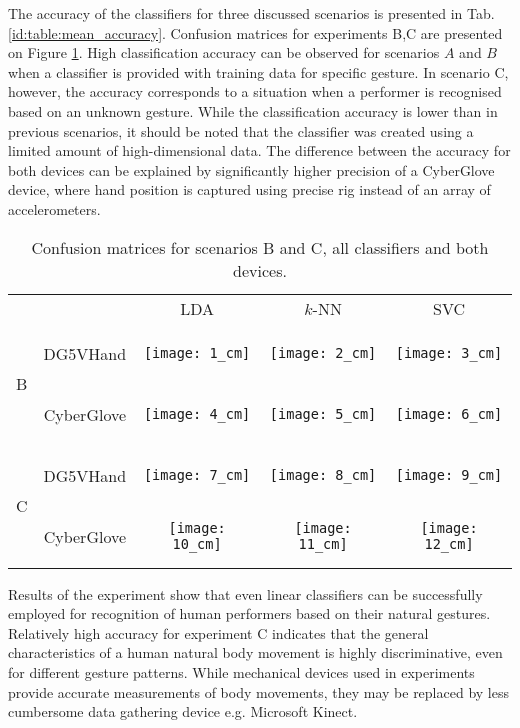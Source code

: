 \documentclass[]{article}
\begin{document}
The accuracy of the classifiers for three discussed scenarios is presented in
Tab. \ref{id:table:mean_accuracy}. Confusion matrices for experiments B,C are
presented  on Figure \ref{fig:confusion_matrices}. High classification accuracy
can be observed for scenarios $A$ and $B$ when a classifier is provided with
training data for specific gesture. In scenario C, however, the accuracy
corresponds to a situation when a performer is recognised based on an unknown 
gesture. While the classification accuracy is lower than in previous scenarios,
it should be noted that the classifier was created using a limited amount of
high-dimensional data. The difference between the accuracy for both devices can
be explained by significantly higher precision of a CyberGlove device, where
hand position is captured using precise rig instead of an array of
accelerometers. 

\begin{table}[ht]
\centering
\begin{tabular}{c| c c c c}
& & LDA & $k$-NN & SVC\\ \multirow{2}{*}{B}
&{\begin{sideways}\parbox{5cm}{\centering DG5VHand}\end{sideways}}
&\texttt{[image: 1\_cm]}
&\texttt{[image: 2\_cm]}
&\texttt{[image: 3\_cm]}\\ 
&{\begin{sideways}\parbox{5cm}{\centering CyberGlove}\end{sideways}}
&\texttt{[image: 4\_cm]}
&\texttt{[image: 5\_cm]}
&\texttt{[image: 6\_cm]}\\ 
\hline 
\multirow{2}{*}{C}
&{\begin{sideways}\parbox{5cm}{\centering DG5VHand}\end{sideways}}
&\texttt{[image: 7\_cm]}
&\texttt{[image: 8\_cm]}
&\texttt{[image: 9\_cm]}\\ 
&{\begin{sideways}\parbox{5cm}{\centering CyberGlove}\end{sideways}}
&\texttt{[image: 10\_cm]}
&\texttt{[image: 11\_cm]}
&\texttt{[image: 12\_cm]} 
\end{tabular}
\caption{Confusion matrices for scenarios B and C, all classifiers and both devices.}
\label{fig:confusion_matrices}
\end{table} 

Results of the experiment show that even linear classifiers can be successfully
employed for recognition of human performers based on their natural gestures.
Relatively high accuracy for experiment C indicates that the general
characteristics of a human natural body movement is highly discriminative, even
for different gesture patterns. While mechanical devices used in experiments
provide accurate measurements of body movements, they may be replaced by less
cumbersome data gathering device e.g. Microsoft Kinect\texttrademark. 
\end{document}
